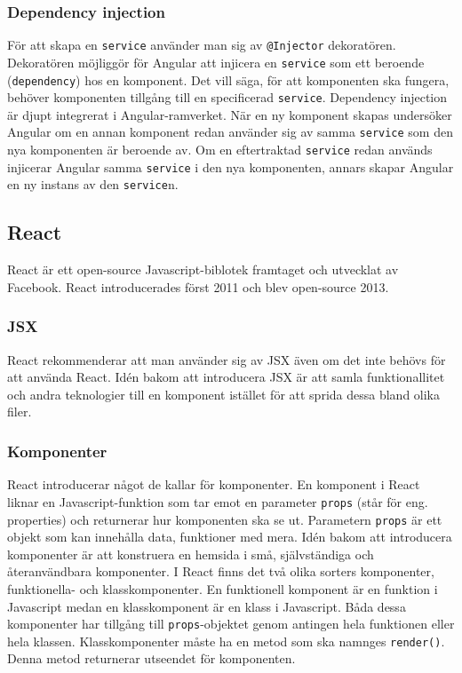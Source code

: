 
\subsubsection{Dependency injection}
För att skapa en \texttt{service} använder man sig av \texttt{@Injector} dekoratören. Dekoratören möjliggör för Angular att injicera en \texttt{service} som ett beroende (\texttt{dependency}) hos en komponent. Det vill säga, för att komponenten ska fungera, behöver komponenten tillgång till en specificerad \texttt{service}. Dependency injection är djupt integrerat i Angular-ramverket. När en ny komponent skapas undersöker Angular om en annan komponent redan använder sig av samma \texttt{service} som den nya komponenten är beroende av. Om en eftertraktad \texttt{service} redan används injicerar Angular samma \texttt{service} i den nya komponenten, annars skapar Angular en ny instans av den \texttt{service}n. \cite{angular-services}


\subsection{React}
React är ett open-source Javascript-biblotek framtaget och utvecklat av Facebook. React introducerades först 2011 och blev open-source 2013. \cite{react-date}


\subsubsection{JSX}
React rekommenderar att man använder sig av JSX även om det inte behövs för att använda React. Idén bakom att introducera JSX är att samla funktionallitet och andra teknologier till en komponent istället för att sprida dessa bland olika filer. \cite{react-jsx}


\subsubsection{Komponenter}
React introducerar något de kallar för komponenter. En komponent i React liknar en Javascript-funktion som tar emot en parameter \texttt{props} (står för eng. properties) och returnerar hur komponenten ska se ut. Parametern \texttt{props} är ett objekt som kan innehålla data, funktioner med mera. Idén bakom att introducera komponenter är att konstruera en hemsida i små, självständiga och återanvändbara komponenter. \cite{react-components} I React finns det två olika sorters komponenter, funktionella- och klasskomponenter. En funktionell komponent är en funktion i Javascript medan en klasskomponent är en klass i Javascript. Båda dessa komponenter har tillgång till \texttt{props}-objektet genom antingen hela funktionen eller hela klassen. Klasskomponenter måste ha en metod som ska namnges \texttt{render()}. Denna metod returnerar utseendet för komponenten.

